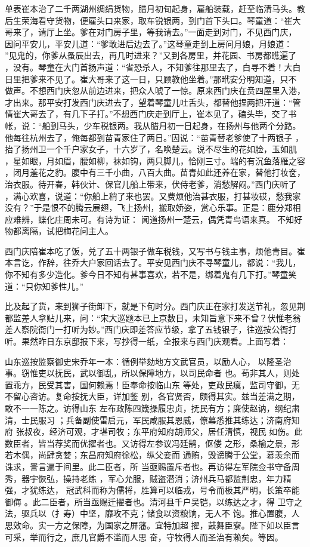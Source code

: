 单表崔本治了二千两湖州绸绢货物，腊月初旬起身，雇船装载，赶至临清马头。教
后生荣海看守货物，便雇头口来家，取车锐银两，到门首下头口。琴童道：“崔大
哥来了，请厅上坐。爹在对门房子里，等我请去。”一面走到对门，不见西门庆，
因问平安儿，平安儿道：“爹敢进后边去了。”这琴童走到上房问月娘，月娘道：
”见鬼的，你爹从蚤辰出去，再几时进来？”又到各房里，并花园、书房都瞧遍了
，没有。琴童在大门首扬声道：“省恐杀人，不知爹往那里去了，白寻不着！大白
日里把爹来不见了。崔大哥来了这一日，只顾教他坐着。”那玳安分明知道，只不
做声。不想西门庆忽从前边进来，把众人唬了一惊。原来西门庆在贲四屋里入港，
才出来。那平安打发西门庆进去了，望着琴童儿吐舌头，都替他捏两把汗道：“管
情崔大哥去了，有几下子打。”不想西门庆走到厅上，崔本见了，磕头毕，交了书
帐，说：“船到马头，少车税银两。我从腊月初一日起身，在扬州与他两个分路。
他每往杭州去了，俺每都到苗青家住了两日。”因说：“苗青替老爹使了十两银子
，抬了扬州卫一个千户家女子，十六岁了，名唤楚云。说不尽生的花如脸，玉如肌
，星如眼，月如眉，腰如柳，袜如钩，两只脚儿，恰刚三寸。端的有沉鱼落雁之容
，闭月羞花之豹。腹中有三千小曲，八百大曲。苗青如此还养在家，替他打妆奁，
治衣服。待开春，韩伙计、保官儿船上带来，伏侍老爹，消愁解闷。”西门庆听了
，满心欢喜，说道：“你船上稍了来也罢。又费烦他治甚衣服，打甚妆砹，愁我家
没有？”于是恨不的腾云展翅，飞上扬州，搬取娇姿，赏心乐事。正是：鹿分郑相
应难辨，蝶化庄周未可。有诗为证：
闻道扬州一楚云，偶凭青鸟语来真。
不知好物都离隔，试把梅花问主人。

西门庆陪崔本吃了饭，兑了五十两银子做车税钱，又写书与钱主事，烦他青目。崔
本言讫，作辞，往乔大户家回话去了。平安见西门庆不寻琴童儿，都说：“我儿，
你不知有多少造化。爹今日不知有甚事喜欢，若不是，绑着鬼有几下打。”琴童笑
道：“只你知爹性儿。”

比及起了货，来到狮子街卸下，就是下旬时分。西门庆正在家打发送节礼，忽见荆
都监差人拿贴儿来，问：“宋大巡题本已上京数日，未知旨意下来不曾？伏惟老翁
差人察院衙门一打听为妙。”西门庆即差答应节级，拿了五钱银子，往巡按公衙打
听。果然昨日东京邸报下来，写抄得一纸，全报来与西门庆观看。上面写着：

山东巡按监察御史宋乔年一本：循例举劾地方文武官员，以励人心，
以隆圣治事。窃惟吏以抚民，武以御乱，所以保障地方，以司民命者
也。苟非其人，则处置乖方，民受其害，国何赖焉！臣奉命按临山东
等处，吏政民瘼，监司守御，无不留心咨访。复命按抚大臣，详加鉴
别，各官贤否，颇得其实。兹当差满之期，敢不一一陈之。访得山东
左布政陈四箴操履忠贞，抚民有方；廉使赵讷，纲纪肃清，士民服习
；兵备副使雷启元，军民咸服其恩威，僚幕悉推其练达；济南府知府
张叔夜，经济可观，才堪司牧；东平府知府胡师父，居任清慎，视民
如伤。此数臣者，皆当荐奖而优擢者也。又访得左参议冯廷鹄，伛偻
之形，桑榆之景，形若木偶，尚肆贪婪；东昌府知府徐松，纵父妾而
通贿，毁谤腾于公堂，慕羡余而诛求，詈言遍于间里。此二臣者，所
当亟赐置斥者也。再访得左军院佥书守备周秀，器宇恢弘，操持老练
，军心允服，贼盗潜消；济州兵马都监荆忠，年力精强，才犹练达，
冠武科而称为儒将，胜算可以临戎，号令而极其严明，长策卒能御侮
。此二臣者，所当亟赐迁擢者也。清河县千户吴铠，以练达之才，得
卫守之法，驱兵以（扌寿）中坚，靡攻不克；储食以资粮饷，无人不
饱。推心置腹，人思效命。实一方之保障，为国家之屏藩。宜特加超
擢，鼓舞臣寮。陛下如以臣言可采，举而行之，庶几官爵不滥而人思
奋，守牧得人而圣治有赖矣。等因。

